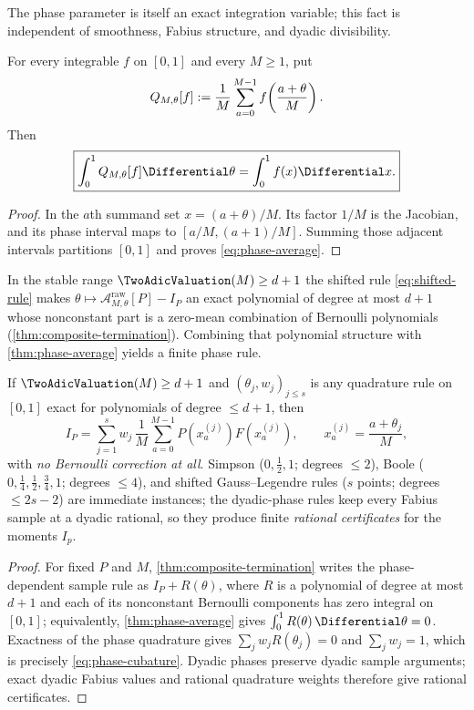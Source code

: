 The phase parameter is itself an exact integration variable; this fact is
independent of smoothness, Fabius structure, and dyadic divisibility.

\begin{theorem}
\label{thm:phase-average}
For every integrable $f$ on $[0,1]$ and every $M\ge1$, put
\[
 Q_{M,\theta}[f]:={1\over M}\sum_{a=0}^{M-1}
 f\!\left({a+\theta\over M}\right).
\]
Then
\begin{equation}
 \boxed{\int_0^1Q_{M,\theta}[f]\Differential\theta
 =\int_0^1f(x)\Differential x.}
 \label{eq:phase-average}
\end{equation}
\end{theorem}

\begin{proof}
In the $a$th summand set $x=(a+\theta)/M$.  Its factor $1/M$ is the
Jacobian, and its phase interval maps to $[a/M,(a+1)/M]$.  Summing those
adjacent intervals partitions $[0,1]$ and proves
\eqref{eq:phase-average}.
\end{proof}

In the stable range $\TwoAdicValuation(M)\ge d+1$ the shifted rule
\eqref{eq:shifted-rule} makes
$\theta\mapsto\mathcal A^{\mathrm{raw}}_{M,\theta}[P]-I_P$ an exact
polynomial of degree at most $d+1$ whose nonconstant part is a zero-mean
combination of Bernoulli polynomials (\cref{thm:composite-termination}).
Combining that polynomial structure with \cref{thm:phase-average} yields a
finite phase rule.

\begin{theorem}
\label{thm:phase-cubature}
If $\TwoAdicValuation(M)\ge d+1$ and $(\theta_j,w_j)_{j\le s}$ is any quadrature
rule on $[0,1]$ exact for polynomials of degree $\le d+1$, then
\begin{equation}
 \boxed{\;
 I_P=\sum_{j=1}^{s}w_j\,
 \frac1M\sum_{a=0}^{M-1}P(x_a^{(j)})F(x_a^{(j)}),
 \qquad x_a^{(j)}=\frac{a+\theta_j}{M},\;}
 \label{eq:phase-cubature}
\end{equation}
with \emph{no Bernoulli correction at all}.  Simpson
($0,\tfrac12,1$; degrees $\le2$), Boole
($0,\tfrac14,\tfrac12,\tfrac34,1$; degrees $\le4$), and shifted
Gauss--Legendre rules ($s$ points; degrees $\le2s-2$) are immediate
instances; the dyadic-phase rules keep every Fabius sample at a
dyadic rational, so they produce finite \emph{rational certificates}
for the moments $I_p$.
\end{theorem}

\begin{proof}
For fixed $P$ and $M$, \cref{thm:composite-termination} writes the
phase-dependent sample rule as $I_P+R(\theta)$, where $R$ is a
polynomial of degree at most $d+1$ and each of its nonconstant
Bernoulli components has zero integral on $[0,1]$; equivalently,
\cref{thm:phase-average} gives
$\int_0^1R(\theta)\,\Differential\theta=0$.  Exactness of the phase
quadrature gives $\sum_jw_jR(\theta_j)=0$ and
$\sum_jw_j=1$, which is precisely \eqref{eq:phase-cubature}.
Dyadic phases preserve dyadic sample arguments; exact dyadic Fabius
values and rational quadrature weights therefore give rational
certificates.
\end{proof}

